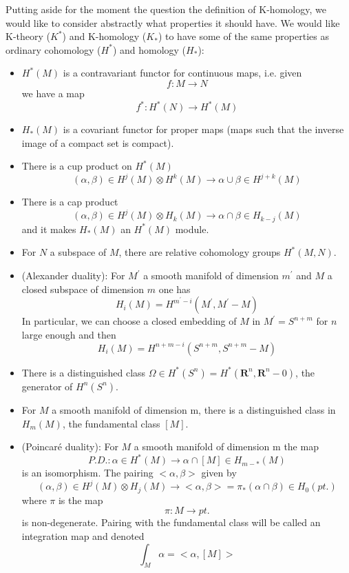 \documentclass[a4paper,a4paper]{article}
\theoremstyle{conjecture}
\begin{document}
Putting aside for the moment the question the definition of K-homology, we
would like to consider abstractly what properties it should have.  We would
like K-theory ($K^*$) and K-homology ($K_*$) to have some of the same properties as
ordinary cohomology ($H^*$) and homology ($H_*$):

\begin {itemize}
\item $H^*(M)$ is a contravariant functor for
continuous maps, i.e. given $$f:M\rightarrow N$$
we have a map
$$f^*:H^*(N) \rightarrow H^*(M)$$
\item $H_*(M)$ is a covariant functor for proper maps (maps such that the inverse
image of a compact set is compact).

\item There is a cup product on $H^*(M)$
$$(\alpha, \beta)\in H^j(M)\otimes H^k(M)\rightarrow \alpha\cup\beta\in H^{j+k}(M)$$

\item There is a cap product
$$(\alpha, \beta)\in H^j(M)\otimes H_k(M)\rightarrow \alpha\cap\beta\in H_{k-j}(M)$$
and it makes $H_*(M)$ an $H^*(M)$ module.

\item For $N$ a subspace of $M$, there are
relative cohomology groups $H^*(M,N)$. 

\item (Alexander duality): For $M^\prime$ a smooth manifold of dimension $m^\prime$ and
$M$ a closed subspace of dimension $m$ one has
$$H_i(M)=H^{m^\prime -i}(M^\prime, M^\prime -M)$$
In particular,
we can choose a closed embedding of $M$ in $M^\prime=S^{n+m}$ for $n$ large enough and
then
$$H_i(M)=H^{n+m-i}(S^{n+m},S^{n+m}-M)$$

\item There is a distinguished class $\Omega\in H^*(S^n)=H^*(\mathbf R^n, \mathbf R^n-0)$, the generator of 
$H^n(S^n)$.

\item For $M$ a smooth manifold of dimension m, there is a distinguished class in $H_m(M)$, the fundamental class $[M]$.

\item (Poincar\'e duality): For $M$ a smooth manifold of dimension m the map
$$P.D.:\alpha \in H^*(M)\rightarrow \alpha\cap [M]\in H_{m-*}(M)$$
is an isomorphism.  The pairing $<\alpha, \beta>$ given by 
$$(\alpha, \beta)\in H^j(M)\otimes H_{j}(M)\rightarrow <\alpha, \beta>=\pi_*(\alpha\cap\beta)\in H_0(pt.)$$
where $\pi$ is the map
$$\pi:M\rightarrow pt.$$
is non-degenerate. Pairing with the fundamental class will be called an integration map
and denoted
$$\int_M \alpha = <\alpha,[M]>$$


\end{itemize}
\end{document}
